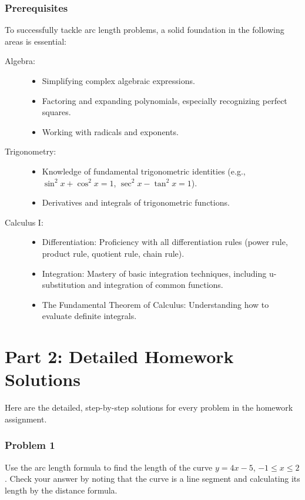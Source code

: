 \documentclass{article}
\begin{document}
\section*{Prerequisites}
To successfully tackle arc length problems, a solid foundation in the following areas is essential:
\begin{description}
    \item[Algebra:]
    \begin{itemize}
        \item Simplifying complex algebraic expressions.
        \item Factoring and expanding polynomials, especially recognizing perfect squares.
        \item Working with radicals and exponents.
    \end{itemize}
    \item[Trigonometry:]
    \begin{itemize}
        \item Knowledge of fundamental trigonometric identities (e.g., $\sin^2x + \cos^2x = 1$, $\sec^2x - \tan^2x = 1$).
        \item Derivatives and integrals of trigonometric functions.
    \end{itemize}
    \item[Calculus I:]
    \begin{itemize}
        \item Differentiation: Proficiency with all differentiation rules (power rule, product rule, quotient rule, chain rule).
        \item Integration: Mastery of basic integration techniques, including u-substitution and integration of common functions.
        \item The Fundamental Theorem of Calculus: Understanding how to evaluate definite integrals.
    \end{itemize}
\end{description}

\part*{Part 2: Detailed Homework Solutions}
Here are the detailed, step-by-step solutions for every problem in the homework assignment.

\section*{Problem 1}
Use the arc length formula to find the length of the curve $y = 4x - 5$, $-1 \le x \le 2$. Check your answer by noting that the curve is a line segment and calculating its length by the distance formula.
\end{document}
